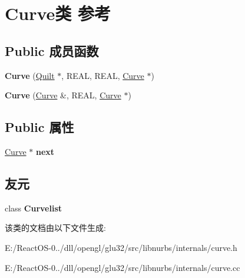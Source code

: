 \hypertarget{class_curve}{}\section{Curve类 参考}
\label{class_curve}
\subsection*{Public 成员函数}
\begin{DoxyCompactItemize}
\item 
\mbox{\label{class_curve_a8f199c6412f80f2617d7a05236c32851}} 
{\bfseries Curve} (\hyperlink{class_quilt}{Quilt} $\ast$, R\+E\+AL, R\+E\+AL, \hyperlink{class_curve}{Curve} $\ast$)
\item 
\mbox{\label{class_curve_a6eeaf18060c9deff7bed178e113edba8}} 
{\bfseries Curve} (\hyperlink{class_curve}{Curve} \&, R\+E\+AL, \hyperlink{class_curve}{Curve} $\ast$)
\end{DoxyCompactItemize}
\subsection*{Public 属性}
\begin{DoxyCompactItemize}
\item 
\mbox{\label{class_curve_afdb7f4647f9d2ea0e9dedfc15c02986c}} 
\hyperlink{class_curve}{Curve} $\ast$ {\bfseries next}
\end{DoxyCompactItemize}
\subsection*{友元}
\begin{DoxyCompactItemize}
\item 
\mbox{\label{class_curve_a4abc9d0e019413a62d18adf9fd2957f2}} 
class {\bfseries Curvelist}
\end{DoxyCompactItemize}


该类的文档由以下文件生成\+:\begin{DoxyCompactItemize}
\item 
E\+:/\+React\+O\+S-\/0../dll/opengl/glu32/src/libnurbs/internals/curve.\+h\item 
E\+:/\+React\+O\+S-\/0../dll/opengl/glu32/src/libnurbs/internals/curve.\+cc\end{DoxyCompactItemize}
